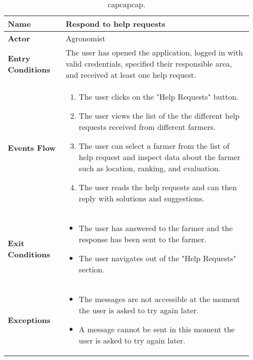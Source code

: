 
\begin{table}[hbt!]
\centering
\caption{\label{tab:addOne{table_counter}}capcapcap.}
\renewcommand{\arraystretch}{1.25}
\begin{tabular}{|l|>{\raggedright\arraybackslash}m{12cm}|}

    \hline
    \textbf{Name} & Respond to help requests\\
    \hline
   	\textbf{Actor} & Agronomist\\
    \hline
    \textbf{Entry Conditions} & The user has opened the application, logged in with valid credentials, specified their responsible area, and received at least one help request.\\
    \hline
    \textbf{Events Flow} & \begin{enumerate}
            \item The user clicks on the "Help Requests" button.
            \item The user views the list of the the different help requests received from different farmers.
            \item The user can select a farmer from the list of help request and inspect data about the farmer such as location, ranking, and evaluation.
            \item The user reads the help requests and can then reply with solutions and suggestions.
       \end{enumerate}\\
    \hline
    \textbf{Exit Conditions} & \begin{itemize}
    	\item The user has answered to the farmer and the response has been sent to the farmer.
    	\item The user navigates out of the "Help Requests" section.
    \end{itemize}\\
    \hline
    \textbf{Exceptions} & 
       \begin{itemize}
          \item The messages are not accessible at the moment the user is asked to try again later.
          \item A message cannot be sent in this moment the user is asked to try again later.
        \end{itemize}
     \\
    \hline
\end{tabular}
\end{table}